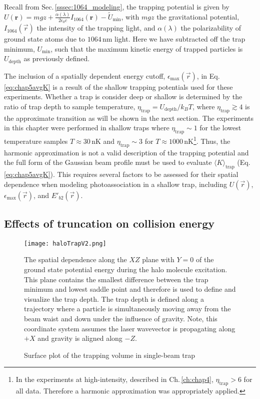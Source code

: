 Recall from Sec.\,\ref{sssec:1064_modeling}, the trapping potential is given by $U(\mathbf{r})=mgz + \frac{\alpha(\lambda)}{2 \epsilon_0 c} I_{1064}(\mathbf{r})-\tilde{U}_{\text{min}}$, with $mgz$ the gravitational potential, $I_{1064}(\vec{r})$ the intensity of the trapping light, and $\alpha(\lambda)$ the polarizability of ground state atoms due to $1064$\,nm light.
Here we have subtracted off the trap minimum, $U_{\text{min}}$, such that the maximum kinetic energy of trapped particles is $U_{\text{depth}}$ as previously defined.

The inclusion of a spatially dependent energy cutoff, $\epsilon_{\text{max}}(\vec{r})$, in Eq.\,\ref{eq:chap5avgK} is a result of the shallow trapping potentials used for these experiments.
Whether a trap is consider deep or shallow is determined by the ratio of trap depth to sample temperature, $\eta_{\text{trap}} = U_\text{depth}/k_B T$, where $\eta_{\text{trap}} \gtrsim 4$ is the approximate transition as will be shown in the next section.
The experiments in this chapter were performed in shallow traps where $\eta_\text{trap} \sim 1$ for the lowest temperature samples $T \approx 30$\,nK and $\eta_\text{trap} \sim 3$ for $T \approx 1000$\,nK\footnote{In the experiments at high-intensity, described in Ch.\,\ref{ch:chap4}, $\eta_\text{trap} > 6$ for all data. Therefore a harmonic approximation was appropriately applied.}.
Thus, the harmonic approximation is not a valid description of the trapping potential and the full form of the Gaussian beam profile must be used to evaluate $\langle K \rangle_\text{trap}$ (Eq.\,\ref{eq:chap5avgK}).
This requires several factors to be assessed for their spatial dependence when modeling photoassociation in a shallow trap, including $U(\vec{r})$, $\epsilon_\text{max}(\vec{r})$, and $E'_{b2}(\vec{r})$.

\subsection{Effects of truncation on collision energy} \label{sec:trunc_trap}
	\begin{figure} 
	\centerline{
	  \texttt{[image: haloTrapV2.png]}}
	  \caption{Surface plot of the trapping volume in single-beam trap}{The spatial dependence along the $XZ$ plane with $Y=0$ of the ground state potential energy during the halo molecule excitation. This plane contains the smallest difference between the trap minimum and lowest saddle point and therefore is used to define and visualize the trap depth. 
	  The trap depth is defined along a trajectory where a particle is simultaneously moving away from the beam waist and down under the influence of gravity. Note, this coordinate system assumes the laser wavevector is propagating along $+X$ and gravity is aligned along $-Z$. }
	  \label{fig:haloTrapModel}
	\end{figure}
	
